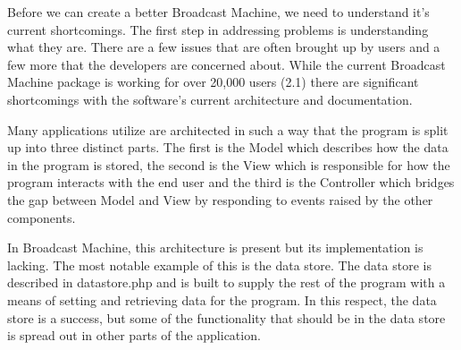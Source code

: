 \documentclass[a4paper,12pt]{report}
\begin{document}


	Before we can create a better Broadcast Machine, we need to understand it's current shortcomings. The first step in addressing problems is understanding what they are. There are a few issues that are often brought up by users and a few more that the developers are concerned about. While the current Broadcast Machine package is working for over 20,000 users (2.1) there are significant shortcomings with the software's current architecture and documentation.

	Many applications utilize are architected in such a way that the program is split up into three distinct parts. The first is the Model which describes how the data in the program is stored, the second is the View which is responsible for how the program interacts with the end user and the third is the Controller which bridges the gap between Model and View by responding to events raised by the other components.
	
	In Broadcast Machine, this architecture is present but its implementation is lacking. The most notable example of this is the data store. The data store is described in datastore.php and is built to supply the rest of the program with a means of setting and retrieving data for the program. In this respect, the data store is a success, but some of the functionality that should be in the data store is spread out in other parts of the application.
	
\end{document}
